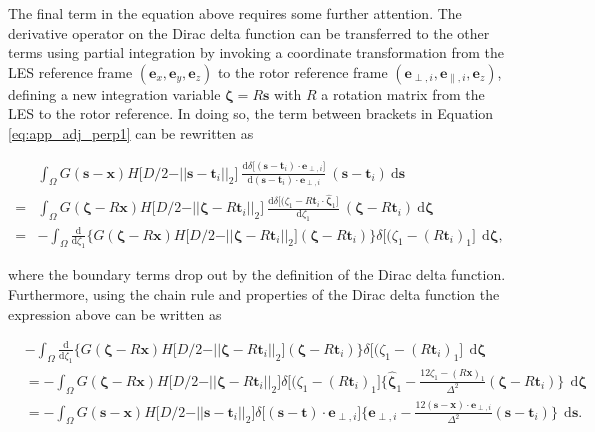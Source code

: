 \documentclass[energies,article,submit,moreauthors,latex,10pt,a4paper]{mdpi}
\newcommand{\ds}{~\text{d}\boldsymbol{s}}
\newcommand{\dzeta}{~\text{d}\boldsymbol{\zeta}}
\newcommand{\bs}[1]{\boldsymbol{#1}}
\newcommand{\dx}{\text{d}\boldsymbol{x}}
\newcommand{\sint}{\int_{\Omega}}
\newcommand{\eperpi}{\bs{e}_{\perp,i}}
\newcommand{\etransi}{\bs{e}_{\parallel,i}}
\newcommand{\diracdelta}{{\delta}}
\begin{document}
\noindent The final term in the equation above requires some further attention. The derivative operator on the Dirac delta function can be transferred to the other terms using partial integration by invoking a coordinate transformation from  the LES reference frame $(\bs{e}_x, \bs{e}_y, \bs{e}_z)$ to the rotor reference frame $(\eperpi, \etransi, \bs{e}_z)$, defining a new integration variable $\bs{\zeta} = R\bs{s}$ with $R$ a rotation matrix from the LES to the rotor reference. In doing so, the term between brackets in Equation \eqref{eq:app_adj_perp1} can be rewritten as 

\begin{align}
&\sint G(\bs{s} - \bs{x})  H\big[D/2 - \vert\vert \bs{s} - \bs{t}_i \vert\vert_2 \big]~\frac{\text{d}\diracdelta\big[(\bs{s} - \bs{t}_i) \cdot \eperpi \big]}{\text{d} (\bs{s} - \bs{t}_i) \cdot \eperpi}~(\bs{s} - \bs{t}_i)  \nonumber \ds\\
= &\sint G(\bs{\zeta} - R\bs{x})  H\big[D/2 - \vert\vert \bs{\zeta} - R\bs{t}_i \vert\vert_2 \big]~\frac{\text{d}\diracdelta\big[(\zeta_1 - R\bs{t}_i \cdot \hat{\bs{\zeta}}_1 \big]}{\text{d}\zeta_1}~(\bs{\zeta} - R\bs{t}_i) \dzeta \nonumber \\
= & - \sint \frac{\text{d}}{\text{d}\zeta_1} \bigg\{ G(\bs{\zeta} - R\bs{x})  H\big[D/2 - \vert\vert \bs{\zeta} - R\bs{t}_i \vert\vert_2 \big] (\bs{\zeta} - R\bs{t}_i)  \bigg\} \diracdelta\big[(\zeta_1 - (R\bs{t}_i)_1 \big]~ \dzeta,
\end{align}

\noindent where the boundary terms drop out by the definition of the Dirac delta function. Furthermore, using the chain rule and properties of the Dirac delta function the expression above can be written as 

\begin{align}
&- \sint \frac{\text{d}}{\text{d}\zeta_1} \bigg\{ G(\bs{\zeta} - R\bs{x})  H\big[D/2 - \vert\vert \bs{\zeta} - R\bs{t}_i \vert\vert_2 \big] (\bs{\zeta} - R\bs{t}_i)  \bigg\} \diracdelta\big[(\zeta_1 - (R\bs{t}_i)_1 \big]~ \dzeta \nonumber\\
&=- \sint G(\bs{\zeta} - R\bs{x})  H\big[D/2 - \vert\vert \bs{\zeta} - R\bs{t}_i \vert\vert_2 \big] \diracdelta\big[(\zeta_1 - (R\bs{t}_i)_1 \big] \bigg\{ \hat{\bs{\zeta}}_1 - \frac{12 \zeta_1 - (R\bs{x})_1}{\Delta^2} (\bs{\zeta} - R \bs{t}_i) \bigg\} ~ \dzeta \nonumber \\
&=- \sint G(\bs{s} - \bs{x})  H\big[D/2 - \vert\vert \bs{s} - \bs{t}_i \vert\vert_2 \big] \diracdelta\big[(\bs{s} - \bs{t})\cdot \eperpi \big] \bigg\{ \eperpi - \frac{12 (\bs{s} - \bs{x})\cdot \eperpi}{\Delta^2} (\bs{s} - \bs{t}_i) \bigg\} ~ \ds.
\end{align}
\end{document}
